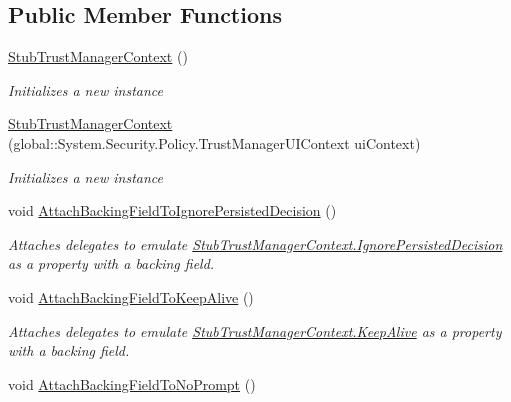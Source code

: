 \subsection*{Public Member Functions}
\begin{DoxyCompactItemize}
\item 
\hyperlink{class_system_1_1_security_1_1_policy_1_1_fakes_1_1_stub_trust_manager_context_a5218b3a7c23d92c6bf90e29c19c9b5f7}{Stub\-Trust\-Manager\-Context} ()
\begin{DoxyCompactList}\small\item\em Initializes a new instance\end{DoxyCompactList}\item 
\hyperlink{class_system_1_1_security_1_1_policy_1_1_fakes_1_1_stub_trust_manager_context_aa111452314ef1e50cd004c187038e599}{Stub\-Trust\-Manager\-Context} (global\-::\-System.\-Security.\-Policy.\-Trust\-Manager\-U\-I\-Context ui\-Context)
\begin{DoxyCompactList}\small\item\em Initializes a new instance\end{DoxyCompactList}\item 
void \hyperlink{class_system_1_1_security_1_1_policy_1_1_fakes_1_1_stub_trust_manager_context_a78e2f0659af2315a4c2a011288c6876d}{Attach\-Backing\-Field\-To\-Ignore\-Persisted\-Decision} ()
\begin{DoxyCompactList}\small\item\em Attaches delegates to emulate \hyperlink{class_system_1_1_security_1_1_policy_1_1_fakes_1_1_stub_trust_manager_context_ad1fba05befd34ff44bee0871e78f3e1c}{Stub\-Trust\-Manager\-Context.\-Ignore\-Persisted\-Decision} as a property with a backing field.\end{DoxyCompactList}\item 
void \hyperlink{class_system_1_1_security_1_1_policy_1_1_fakes_1_1_stub_trust_manager_context_ac34201ffc06eeceb4d68e11681d2279a}{Attach\-Backing\-Field\-To\-Keep\-Alive} ()
\begin{DoxyCompactList}\small\item\em Attaches delegates to emulate \hyperlink{class_system_1_1_security_1_1_policy_1_1_fakes_1_1_stub_trust_manager_context_a89dc5457950ab2999763ad696c2c6334}{Stub\-Trust\-Manager\-Context.\-Keep\-Alive} as a property with a backing field.\end{DoxyCompactList}\item 
void \hyperlink{class_system_1_1_security_1_1_policy_1_1_fakes_1_1_stub_trust_manager_context_a7dcc3fe69c392365fa90539f1dfa7c16}{Attach\-Backing\-Field\-To\-No\-Prompt} ()

\end{DoxyCompactItemize}
